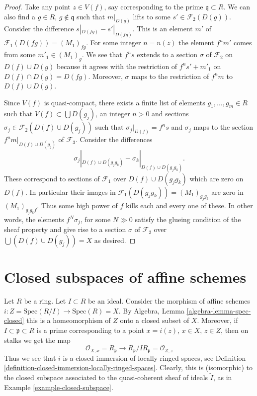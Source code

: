 \begin{proof}
\medskip\noindent
Take any point $z \in V(f)$, say corresponding to the
prime $\mathfrak q \subset R$. We can also find a $g \in R$,
$g \not \in \mathfrak q$ such that $m|_{D(g)}$ lifts
to some $s' \in \mathcal{F}_2(D(g))$.
Consider the difference $s|_{D(fg)} - s'|_{D(fg)}$.
This is an element $m'$ of $\mathcal{F}_1(D(fg)) = (M_1)_{fg}$.
For some integer $n = n(z)$ the element $f^n m'$ comes
from some $m'_1 \in (M_1)_g$. We see that
$f^n s$ extends to a section $\sigma$ of $\mathcal{F}_2$ on $D(f) \cup D(g)$
because it agrees with the restriction of
$f^n s' + m'_1$ on $D(f) \cap D(g) = D(fg)$.
Moreover, $\sigma$ maps to the restriction of $f^n m$
to $D(f) \cup D(g)$.

\medskip\noindent
Since $V(f)$ is quasi-compact, there exists a finite list
of elements $g_1, \ldots, g_m \in R$ such that
$V(f) \subset \bigcup D(g_j)$, an integer $n > 0$ and sections
$\sigma_j \in \mathcal{F}_2(D(f) \cup D(g_j))$ such that
$\sigma_j|_{D(f)} = f^n s$ and $\sigma_j$ maps to the section
$f^nm|_{D(f) \cup D(g_j)}$ of $\mathcal{F}_3$.
Consider the differences
$$
\sigma_j|_{D(f) \cup D(g_jg_k)}
-
\sigma_k|_{D(f) \cup D(g_jg_k)}.
$$
These correspond to sections of $\mathcal{F}_1$
over $D(f) \cup D(g_jg_k)$ which are zero
on $D(f)$. In particular their images in
$\mathcal{F}_1(D(g_jg_k)) = (M_1)_{g_jg_k}$
are zero in $(M_1)_{g_jg_kf}$.
Thus some high power of $f$ kills each and every one of these.
In other words, the elements $f^N \sigma_j$, for some $N \gg 0$
satisfy the glueing condition of the sheaf property and
give rise to a section $\sigma $ of $\mathcal{F}_2$
over $\bigcup (D(f) \cup D(g_j)) = X$ as desired.
\end{proof}







\section{Closed subspaces of affine schemes}
\label{section-closed-in-affine}

\begin{example}
\label{example-closed-immersion-affines}
Let $R$ be a ring.
Let $I \subset R$ be an ideal.
Consider the morphism of affine schemes
$i : Z = \text{Spec}(R/I) \to \text{Spec}(R) = X$.
By Algebra, Lemma \ref{algebra-lemma-spec-closed}
this is a homeomorphism of $Z$ onto a closed
subset of $X$. Moreover, if $I \subset \mathfrak p \subset R$
is a prime corresponding to a point $x = i(z)$, $x \in X$,
$z \in Z$, then on stalks we get the map
$$
\mathcal{O}_{X, x} = R_{\mathfrak p}
\longrightarrow
R_{\mathfrak p}/IR_{\mathfrak p} = \mathcal{O}_{Z, z}
$$
Thus we see that $i$ is a closed immersion of locally ringed spaces,
see Definition \ref{definition-closed-immersion-locally-ringed-spaces}.
Clearly, this is (isomorphic) to the closed subspace associated
to the quasi-coherent sheaf of ideals $\widetilde I$, as in 
Example \ref{example-closed-subspace}.
\end{example}

